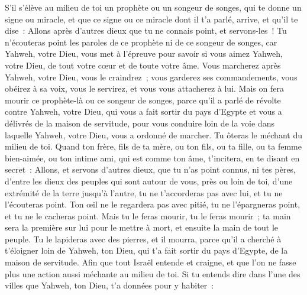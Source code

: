 \begin{multicols}{2}
\VerseOne{}S'il s'élève au milieu de toi un prophète ou un songeur de songes, qui te donne un signe ou miracle,
et que ce signe ou ce miracle dont il t'a parlé, arrive, et qu'il te dise~: Allons après d'autres dieux que tu ne connais point, et servons-les~!
Tu n'écouteras point les paroles de ce prophète ni de ce songeur de songes, car Yahweh, votre Dieu, vous met à l'épreuve pour savoir si vous aimez Yahweh, votre Dieu, de tout votre cœur et de toute votre âme.
Vous marcherez après Yahweh, votre Dieu, vous le craindrez~; vous garderez ses commandements, vous obéirez à sa voix, vous le servirez, et vous vous attacherez à lui.
Mais on fera mourir ce prophète-là ou ce songeur de songes, parce qu'il a parlé de révolte contre Yahweh, votre Dieu, qui vous a fait sortir du pays d'Egypte et vous a délivrés de la maison de servitude, pour vous conduire loin de la voie dans laquelle Yahweh, votre Dieu, vous a ordonné de marcher. Tu ôteras le méchant du milieu de toi.
Quand ton frère, fils de ta mère, ou ton fils, ou ta fille, ou ta femme bien-aimée, ou ton intime ami, qui est comme ton âme, t'incitera, en te disant en secret~: Allons, et servons d'autres dieux, que tu n'as point connus, ni tes pères,
d'entre les dieux des peuples qui sont autour de vous, près ou loin de toi, d'une extrémité de la terre jusqu'à l'autre,
tu ne t'accorderas pas avec lui, et tu ne l'écouteras point. Ton œil ne le regardera pas avec pitié, tu ne l'épargneras point, et tu ne le cacheras point.
Mais tu le feras mourir, tu le feras mourir~; ta main sera la première sur lui pour le mettre à mort, et ensuite la main de tout le peuple.
Tu le lapideras avec des pierres, et il mourra, parce qu'il a cherché à t'éloigner loin de Yahweh, ton Dieu, qui t'a fait sortir du pays d'Egypte, de la maison de servitude.
Afin que tout Israël entende et craigne, et que l'on ne fasse plus une action aussi méchante au milieu de toi.
Si tu entends dire dans l'une des villes que Yahweh, ton Dieu, t'a données pour y habiter~:

\end{multicols}

